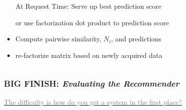 \documentclass[xcolor={dvipsnames}]{beamer}
\begin{document}
{{\begin{columns}
\begin{column}{.8\textwidth}
\begin{itemize}
\item[At Request Time:] Serve up best prediction score 
\item[or] use factorization dot product to prediction score 

\item<11->[During Down Time:] Compute pairwise similarity, $N_i$, and predictions
\item<11->[or] re-factorize matrix based on newly acquired data  

\end{itemize}

\end{column}
\end{columns}
}
}



\frame
{
\frametitle{BIG FINISH: \emph{Evaluating the Recommender}}


\underline{\textcolor{gray}{The difficulty is how do you get a system in the first place?}}

\begin{columns}

\hspace*{-1em}\begin{column}{.75\textwidth}


\end{column}
\end{columns}}
\end{document}
